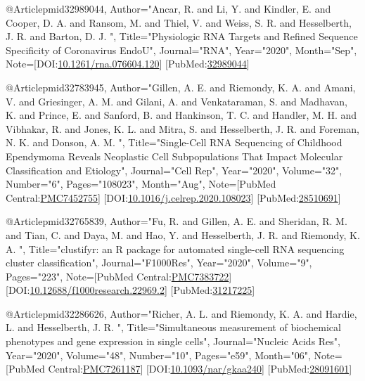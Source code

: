 @Article{pmid32989044,
   Author="Ancar, R.  and Li, Y.  and Kindler, E.  and Cooper, D. A.  and Ransom, M.  and Thiel, V.  and Weiss, S. R.  and Hesselberth, J. R.  and Barton, D. J. ",
   Title="{{P}hysiologic {R}{N}{A} {T}argets and {R}efined {S}equence {S}pecificity of {C}oronavirus {E}ndo{U}}",
   Journal="RNA",
   Year="2020",
   Month="Sep",
   Note={[DOI:\href{https://dx.doi.org/10.1261/rna.076604.120}{10.1261/rna.076604.120}] [PubMed:\href{https://www.ncbi.nlm.nih.gov/pubmed/32989044}{32989044}] }
}

@Article{pmid32783945,
   Author="Gillen, A. E.  and Riemondy, K. A.  and Amani, V.  and Griesinger, A. M.  and Gilani, A.  and Venkataraman, S.  and Madhavan, K.  and Prince, E.  and Sanford, B.  and Hankinson, T. C.  and Handler, M. H.  and Vibhakar, R.  and Jones, K. L.  and Mitra, S.  and Hesselberth, J. R.  and Foreman, N. K.  and Donson, A. M. ",
   Title="{{S}ingle-{C}ell {R}{N}{A} {S}equencing of {C}hildhood {E}pendymoma {R}eveals {N}eoplastic {C}ell {S}ubpopulations {T}hat {I}mpact {M}olecular {C}lassification and {E}tiology}",
   Journal="Cell Rep",
   Year="2020",
   Volume="32",
   Number="6",
   Pages="108023",
   Month="Aug",
   Note={[PubMed Central:\href{https://www.ncbi.nlm.nih.gov/pmc/articles/PMC7452755}{PMC7452755}] [DOI:\href{https://dx.doi.org/10.1016/j.celrep.2020.108023}{10.1016/j.celrep.2020.108023}] [PubMed:\href{https://www.ncbi.nlm.nih.gov/pubmed/28510691}{28510691}] }
}

@Article{pmid32765839,
   Author="Fu, R.  and Gillen, A. E.  and Sheridan, R. M.  and Tian, C.  and Daya, M.  and Hao, Y.  and Hesselberth, J. R.  and Riemondy, K. A. ",
   Title="{clustifyr: an {R} package for automated single-cell {R}{N}{A} sequencing cluster classification}",
   Journal="F1000Res",
   Year="2020",
   Volume="9",
   Pages="223",
   Note={[PubMed Central:\href{https://www.ncbi.nlm.nih.gov/pmc/articles/PMC7383722}{PMC7383722}] [DOI:\href{https://dx.doi.org/10.12688/f1000research.22969.2}{10.12688/f1000research.22969.2}] [PubMed:\href{https://www.ncbi.nlm.nih.gov/pubmed/31217225}{31217225}] }
}

@Article{pmid32286626,
   Author="Richer, A. L.  and Riemondy, K. A.  and Hardie, L.  and Hesselberth, J. R. ",
   Title="{{S}imultaneous measurement of biochemical phenotypes and gene expression in single cells}",
   Journal="Nucleic Acids Res",
   Year="2020",
   Volume="48",
   Number="10",
   Pages="e59",
   Month="06",
   Note={[PubMed Central:\href{https://www.ncbi.nlm.nih.gov/pmc/articles/PMC7261187}{PMC7261187}] [DOI:\href{https://dx.doi.org/10.1093/nar/gkaa240}{10.1093/nar/gkaa240}] [PubMed:\href{https://www.ncbi.nlm.nih.gov/pubmed/28091601}{28091601}] }
}


